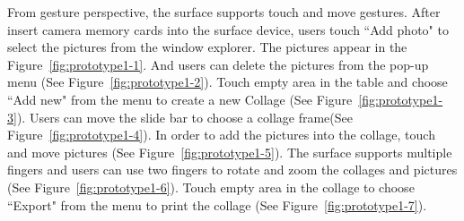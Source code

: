 \documentclass{tei2013}
\begin{document}
From gesture perspective, the surface supports touch and move gestures. After insert camera memory cards into the surface device, users touch ``Add photo" to select the pictures from the window explorer. The pictures appear in the Figure~\ref{fig:prototype1-1}. And users can delete the pictures from the pop-up menu (See Figure~\ref{fig:prototype1-2}). Touch empty area in the table and choose ``Add new" from the menu to create a new Collage (See Figure~\ref{fig:prototype1-3}). Users can move the slide bar to choose a collage frame(See Figure~\ref{fig:prototype1-4}). In order to add the pictures into the collage, touch and move pictures (See Figure~\ref{fig:prototype1-5}). The surface supports multiple fingers and users can use two fingers to rotate and zoom the collages and pictures (See Figure~\ref{fig:prototype1-6}). Touch empty area in the collage to choose ``Export" from the menu to print the collage (See Figure~\ref{fig:prototype1-7}).
\end{document}
